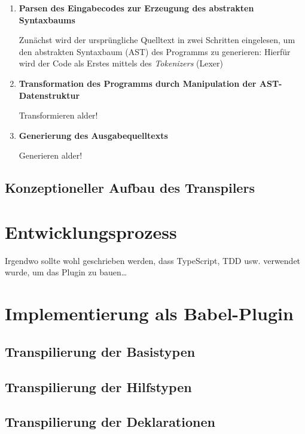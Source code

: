 \begin{enumerate}
  \item \textbf{Parsen des Eingabecodes zur Erzeugung des abstrakten Syntaxbaums}

    Zunächst wird der ursprüngliche Quelltext in zwei Schritten eingelesen, um den abstrakten Syntaxbaum (AST) des Programms zu generieren: Hierfür wird der Code als Erstes mittels des \emph{Tokenizers} (Lexer)

  \item \textbf{Transformation des Programms durch Manipulation der AST-Datenstruktur}

    Transformieren alder!

  \item \textbf{Generierung des Ausgabequelltexts}

    Generieren alder!
\end{enumerate}




\subsection{Konzeptioneller Aufbau des Transpilers}

\section{Entwicklungsprozess}
  Irgendwo sollte wohl geschrieben werden, dass TypeScript, TDD usw. verwendet wurde, um das Plugin zu bauen\dots

\section{Implementierung als Babel-Plugin}
  \subsection{Transpilierung der Basistypen}
  \subsection{Transpilierung der Hilfstypen}
  \subsection{Transpilierung der Deklarationen}

